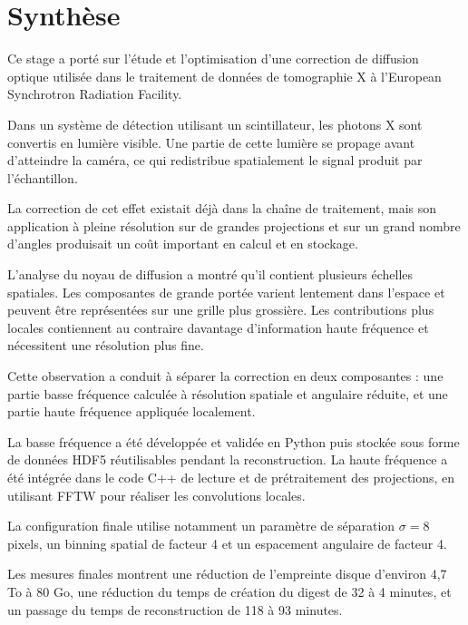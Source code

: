 \documentclass[11pt,a4paper]{report}
\begin{document}
\chapter*{Synthèse}

Ce stage a porté sur l'étude et l'optimisation d'une correction de diffusion
optique utilisée dans le traitement de données de tomographie X à
l'European Synchrotron Radiation Facility.

Dans un système de détection utilisant un scintillateur, les photons X sont
convertis en lumière visible. Une partie de cette lumière se propage avant
d'atteindre la caméra, ce qui redistribue spatialement le signal produit
par l'échantillon.

La correction de cet effet existait déjà dans la chaîne de traitement,
mais son application à pleine résolution sur de grandes projections et sur
un grand nombre d'angles produisait un coût important en calcul et en
stockage.

L'analyse du noyau de diffusion a montré qu'il contient plusieurs échelles
spatiales. Les composantes de grande portée varient lentement dans l'espace
et peuvent être représentées sur une grille plus grossière. Les
contributions plus locales contiennent au contraire davantage
d'information haute fréquence et nécessitent une résolution plus fine.

Cette observation a conduit à séparer la correction en deux composantes :
une partie basse fréquence calculée à résolution spatiale et angulaire
réduite, et une partie haute fréquence appliquée localement.

La basse fréquence a été développée et validée en Python puis stockée sous
forme de données HDF5 réutilisables pendant la reconstruction. La haute
fréquence a été intégrée dans le code C++ de lecture et de prétraitement des
projections, en utilisant FFTW pour réaliser les convolutions locales.

La configuration finale utilise notamment un paramètre de séparation
$\sigma=8$ pixels, un binning spatial de facteur 4 et un espacement
angulaire de facteur 4.

Les mesures finales montrent une réduction de l'empreinte disque d'environ
4,7 To à 80 Go, une réduction du temps de création du digest de 32 à
4 minutes, et un passage du temps de reconstruction de 118 à 93 minutes.

\tableofcontents
\clearpage

\end{document}

